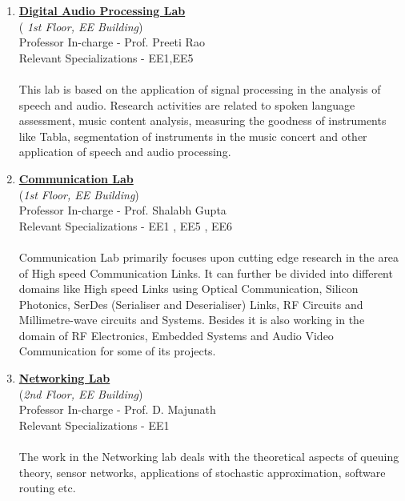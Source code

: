 \documentclass[openany]{book} %
\begin{document}
\begin{enumerate}
\item  \href{https://www.ee.iitb.ac.in/student/~daplab/people/index.html} {\color{blue}\textbf{Digital Audio Processing Lab}}\\
    (\textit{ 1st Floor, EE Building})\\
    Professor In-charge - Prof. Preeti Rao\\
Relevant Specializations - EE1,EE5\\
\\
This lab is based on the application of signal processing in the analysis of speech and audio. Research activities are related to spoken language assessment, music content analysis, measuring the goodness of instruments like Tabla, segmentation of instruments in the music concert and other application of speech and audio processing.\\




\item \href{https://www.ee.iitb.ac.in/student/~comlab/index.htm} {\color{blue}\textbf{Communication Lab}}\\
	(\textit{1st Floor, EE Building})\\
    Professor In-charge - Prof. Shalabh Gupta\\
Relevant Specializations - EE1 , EE5 , EE6\\
\\
Communication Lab primarily focuses upon cutting 
edge research in the area of High speed Communication 
Links. It can further be divided into different domains like  High speed Links using Optical Communication, 
Silicon Photonics, SerDes (Serialiser and Deserialiser) Links, RF Circuits and Millimetre-wave circuits and Systems.  Besides it is also working in the domain of RF Electronics,  Embedded Systems and Audio Video Communication for some of its projects.\\

\item  \href{https://www.ee.iitb.ac.in/web/research/labs/networking} {\color{blue}\textbf{Networking Lab}} \\
	(\textit{2nd Floor, EE Building})\\
    Professor In-charge - Prof. D. Majunath\\
Relevant Specializations - EE1\\
\\
The work in the Networking lab deals with the theoretical aspects of queuing theory, sensor networks, applications of stochastic approximation, software routing etc. \\


\end{enumerate}
\end{document}
